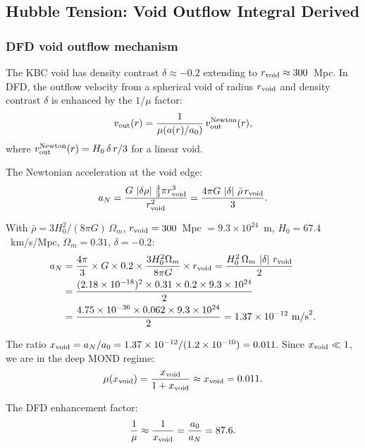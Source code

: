 \documentclass[11pt]{article}
\theoremstyle{definition}
\theoremstyle{remark}
\newcommand{\ee}[1]{\times 10^{#1}}
\newcommand{\abs}[1]{\left|#1\right|}
\begin{document}
\subsection{Hubble Tension: Void Outflow Integral Derived}
\label{sec:hubble-revisited}

\subsubsection{DFD void outflow mechanism}

The KBC void has density contrast $\delta \approx -0.2$ extending to
$r_{\rm void} \approx 300$~Mpc. In DFD, the outflow velocity from
a spherical void of radius $r_{\rm void}$ and density contrast $\delta$
is enhanced by the $1/\mu$ factor:
\begin{equation}
v_{\rm out}(r) = \frac{1}{\mu(a(r)/a_0)}\,v_{\rm out}^{\rm Newton}(r),
\end{equation}
where $v_{\rm out}^{\rm Newton}(r) = H_0\,\delta\,r/3$ for a linear void.

The Newtonian acceleration at the void edge:
\begin{equation}
a_N = \frac{G\,\abs{\delta\rho}\,\frac{4}{3}\pi r_{\rm void}^3}
{r_{\rm void}^2} = \frac{4\pi G\,\abs{\delta}\,\bar\rho\,r_{\rm void}}{3}.
\end{equation}

With $\bar\rho = 3H_0^2/(8\pi G)\,\Omega_m$,
$r_{\rm void} = 300$~Mpc $= 9.3\ee{24}$~m,
$H_0 = 67.4$~km/s/Mpc, $\Omega_m = 0.31$, $\delta = -0.2$:
\begin{align}
a_N &= \frac{4\pi}{3}\times G \times 0.2 \times \frac{3H_0^2 \Omega_m}{8\pi G}
\times r_{\rm void}
= \frac{H_0^2\,\Omega_m\,\abs{\delta}\,r_{\rm void}}{2} \nonumber\\
&= \frac{(2.18\ee{-18})^2 \times 0.31 \times 0.2 \times 9.3\ee{24}}{2}
\nonumber\\
&= \frac{4.75\ee{-36} \times 0.062 \times 9.3\ee{24}}{2}
= 1.37\ee{-12}~\text{m/s}^2.
\end{align}

The ratio $x_{\rm void} = a_N/a_0 = 1.37\ee{-12}/(1.2\ee{-10}) = 0.011$.
Since $x_{\rm void} \ll 1$, we are in the deep MOND regime:
\begin{equation}
\mu(x_{\rm void}) = \frac{x_{\rm void}}{1 + x_{\rm void}} \approx x_{\rm void}
= 0.011.
\end{equation}

The DFD enhancement factor:
\begin{equation}
\frac{1}{\mu} \approx \frac{1}{x_{\rm void}} = \frac{a_0}{a_N} = 87.6.
\end{equation}
\end{document}
